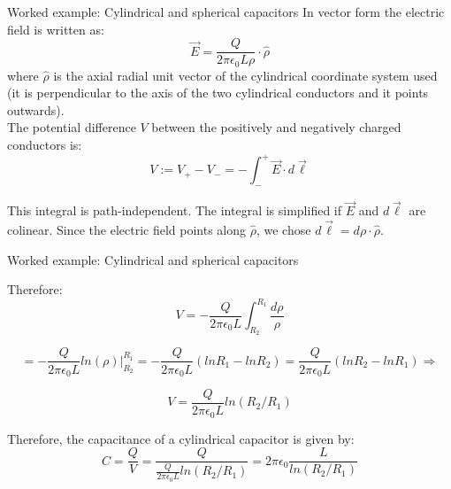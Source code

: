 {\begin{frame}{Worked example: Cylindrical and spherical capacitors}
  In vector form the electric field is written as:
  \begin{equation*}
    \vec{E} = \frac{Q}{2\pi \epsilon_0 L \rho} \cdot \hat{\rho}
  \end{equation*}
  where $\hat{\rho}$ is the axial radial unit vector of the cylindrical
  coordinate system used (it is perpendicular to the axis of the
  two cylindrical conductors and it points outwards).\\

  The potential difference $V$ between the positively and negatively
  charged conductors is:
  \begin{equation*}
      V := V_{+} - V_{-} = - \int_{-}^{+} \vec{E} \cdot d\vec{\ell}
  \end{equation*}

  This integral is path-independent.
  The integral is simplified if $\vec{E}$ and $d\vec{\ell}$ are colinear.
  Since the electric field points along  $\hat{\rho}$, we chose
  $d\vec{\ell} = d\rho \cdot \hat{\rho}$.\\

\end{frame}

%
%
%

\begin{frame}{Worked example: Cylindrical and spherical capacitors}

  Therefore:
  \begin{equation*}
      V = - \frac{Q}{2\pi \epsilon_0 L} \int_{R_2}^{R_1} \frac{d\rho}{\rho}
  \end{equation*}

  \begin{equation*}
        = -  \frac{Q}{2\pi \epsilon_0 L} ln(\rho) \rvert_{R_2}^{R_1} =
          - \frac{Q}{2\pi \epsilon_0 L}  (ln R_1 - ln R_2) =
            \frac{Q}{2\pi \epsilon_0 L}  (ln R_2 - ln R_1) \Rightarrow
  \end{equation*}

  \begin{equation*}
        V = \frac{Q}{2\pi \epsilon_0 L}  ln(R_2/R_1)
  \end{equation*}

  Therefore, the capacitance of a cylindrical capacitor is given by:
  \begin{equation*}
      C = \frac{Q}{V} = \frac{Q}{\frac{Q}{2\pi \epsilon_0 L}  ln(R_2/R_1)} =
             2\pi \epsilon_0 \frac{L}{ln(R_2/R_1)}
  \end{equation*}

\end{frame}

}
